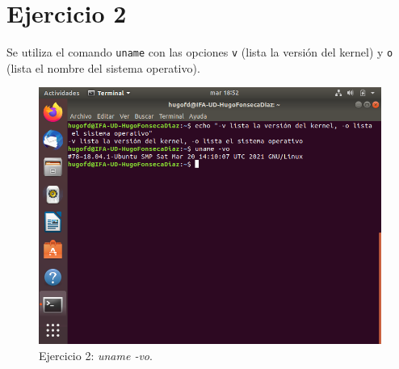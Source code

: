 \documentclass[11pt]{article}
\begin{document}
\section{Ejercicio 2}
Se utiliza el comando \verb|uname| con las opciones \verb|v| (lista la versión del kernel) y \verb|o| (lista el nombre del sistema operativo).
\begin{figure}[h!]
    \caption{Ejercicio 2: \textit{uname -vo}.}
  \centering
  \includegraphics{e2.png}
\end{figure}
\begin{thebibliography}{8}
\end{thebibliography}
\end{document}

